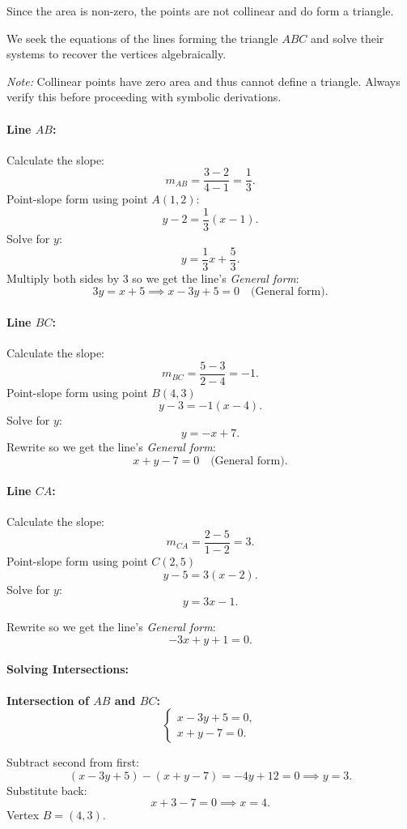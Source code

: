 \documentclass[10pt,twocolumn]{article}
\begin{document}
Since the area is non-zero, the points are not collinear and do form a triangle.

We seek the equations of the lines forming the triangle \(ABC\) and solve their systems to recover the vertices algebraically.

\emph{Note:} Collinear points have zero area and thus cannot define a triangle. Always verify this before proceeding with symbolic derivations.

\paragraph{Line \(AB\):}
Calculate the slope:
\[
m_{AB} = \frac{3 - 2}{4 - 1} = \frac{1}{3}.
\]
Point-slope form using point \(A(1,2)\):
\[
y - 2 = \frac{1}{3}(x - 1).
\]
Solve for \(y\):
\[
y = \frac{1}{3}x + \frac{5}{3}.
\]
Multiply both sides by 3 so we get the line's \textit{General form}:
\[
3y = x + 5 \implies x - 3y + 5 = 0 \quad \text{(General form)}.
\]

\paragraph{Line \(BC\):}
Calculate the slope:
\[
m_{BC} = \frac{5 - 3}{2 - 4} = -1.
\]
Point-slope form using point \( B(4,3) \)
\[
y - 3 = -1(x - 4).
\]
Solve for \(y\):
\[
y = -x + 7.
\]
Rewrite so we get the line's \textit{General form}:
\[
x + y - 7 = 0  \quad \text{(General form)}.
\]

\paragraph{Line \(CA\):}
Calculate the slope:
\[
m_{CA} = \frac{2 - 5}{1 - 2} = 3.
\]
Point-slope form using point \( C(2,5) \)
\[
y - 5 = 3(x - 2).
\]
Solve for \(y\):
\[
y = 3x - 1.
\]

Rewrite so we get the line's \textit{General form}:
\[
-3x + y + 1 = 0.
\]

\paragraph{Solving Intersections:}

\textbf{Intersection of \(AB\) and \(BC\):}
\[
\begin{cases}
x - 3y + 5 = 0, \\
x + y - 7 = 0.
\end{cases}
\]

Subtract second from first:
\[
(x - 3y + 5) - (x + y - 7) = -4y + 12 = 0 \implies y = 3.
\]
Substitute back:
\[
x + 3 - 7 = 0 \implies x = 4.
\]
Vertex \(B = (4,3)\).
\end{document}
